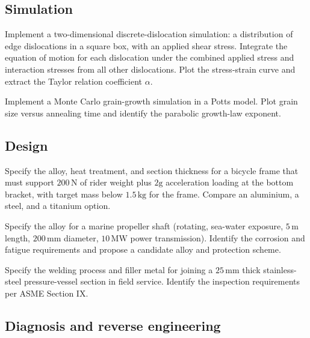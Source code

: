 \subsection*{Simulation}

\begin{exercise}
Implement a two-dimensional discrete-dislocation simulation: a
distribution of edge dislocations in a square box, with an applied
shear stress. Integrate the equation of motion for each dislocation
under the combined applied stress and interaction stresses from all
other dislocations. Plot the stress-strain curve and extract the
Taylor relation coefficient $\alpha$.
\end{exercise}

\begin{exercise}
Implement a Monte Carlo grain-growth simulation in a Potts model.
Plot grain size versus annealing time and identify the parabolic
growth-law exponent.
\end{exercise}

\subsection*{Design}

\begin{exercise}
Specify the alloy, heat treatment, and section thickness for a
bicycle frame that must support $200\,\text{N}$ of rider weight plus
$2\text{g}$ acceleration loading at the bottom bracket, with target
mass below $1.5\,\text{kg}$ for the frame. Compare an aluminium, a
steel, and a titanium option.
\end{exercise}

\begin{exercise}
Specify the alloy for a marine propeller shaft (rotating, sea-water
exposure, $5\,\text{m}$ length, $200\,\text{mm}$ diameter, $10\,\text{MW}$
power transmission). Identify the corrosion and fatigue requirements
and propose a candidate alloy and protection scheme.
\end{exercise}

\begin{exercise}
Specify the welding process and filler metal for joining a $25\,
\text{mm}$ thick stainless-steel pressure-vessel section in field
service. Identify the inspection requirements per ASME Section IX.
\end{exercise}

\subsection*{Diagnosis and reverse engineering}

